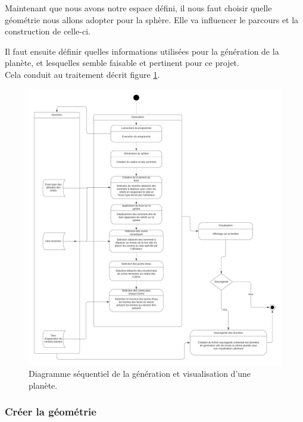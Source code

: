 \documentclass[a4paper]{article}
\begin{document}
    Maintenant que nous avons notre espace défini, il nous faut choisir quelle géométrie nous allons adopter pour la sphère. Elle va influencer le parcours et la construction de celle-ci.
    
    Il faut ensuite définir quelles informations utilisées pour la génération de la planète, et lesquelles semble faisable et pertinent pour ce projet.\\
    
    Cela conduit au traitement décrit figure \ref{sequence}. 

    \begin{figure}[!h]
            \begin{center}
            \includegraphics[scale=0.6]{img/workflow_chart.png}
            \caption{Diagramme séquentiel de la génération et visualisation d'une planète.}
            \label{sequence}
            \end{center}
    \end{figure}
    \newpage
    \subsubsection{Créer la géométrie}
\end{document}
